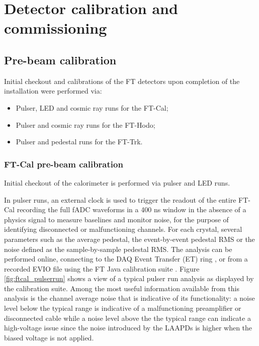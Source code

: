 \section{Detector calibration and commissioning}\label{sec:calibration}

\subsection{Pre-beam calibration}
Initial checkout and calibrations of the FT detectors upon completion of the installation were performed via:
\begin{itemize}
    \item Pulser, LED and cosmic ray runs for the FT-Cal;
    \item Pulser and cosmic ray runs for the FT-Hodo;
    \item Pulser and pedestal runs for the FT-Trk.
\end{itemize}

\subsubsection{FT-Cal pre-beam calibration}
Initial checkout of the calorimeter is performed via pulser and LED runs. 

In pulser runs, an external clock is used to trigger the readout of the entire FT-Cal recording the full fADC waveforms in a 400 ns window in the absence of a physics signal to measure baselines and monitor noise, for the purpose of identifying disconnected or malfunctioning channels. For each crystal, several parameters such as the average pedestal, the event-by-event pedestal RMS or the noise defined as the sample-by-sample pedestal RMS. The analysis can be performed online, connecting to the DAQ Event Transfer (ET) ring \cite{daq}, or from a recorded EVIO file using the FT Java calibration suite \cite{reconstruction}. Figure \ref{fig:ftcal_pulserrun} shows a view of a typical pulser run analysis as displayed by the calibration suite. Among the most useful information available from this analysis is the channel average noise that is indicative of its functionality: a noise level below the typical range is indicative of a malfunctioning preamplifier or disconnected cable while a noise level above the the typical range can indicate a high-voltage issue since the noise introduced by the LAAPDs is higher when the biased voltage is not applied. 

